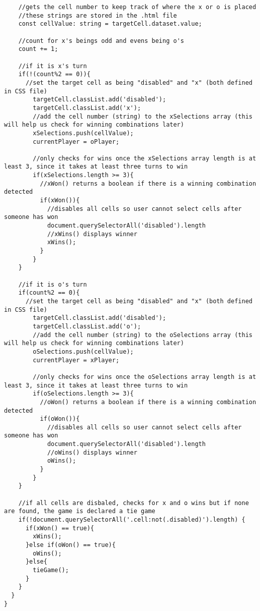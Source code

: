 \documentclass{article}
\theoremstyle{theorem}
\theoremstyle{definition}
\theoremstyle{remark}
\begin{document}
\begin{lstlisting}
    //gets the cell number to keep track of where the x or o is placed
    //these strings are stored in the .html file
    const cellValue: string = targetCell.dataset.value;

    //count for x's beings odd and evens being o's
    count += 1;

    //if it is x's turn
    if(!(count%2 == 0)){
      //set the target cell as being "disabled" and "x" (both defined in CSS file)
        targetCell.classList.add('disabled');
        targetCell.classList.add('x');
        //add the cell number (string) to the xSelections array (this will help us check for winning combinations later)
        xSelections.push(cellValue);
        currentPlayer = oPlayer;

        //only checks for wins once the xSelections array length is at least 3, since it takes at least three turns to win
        if(xSelections.length >= 3){
          //xWon() returns a boolean if there is a winning combination detected
          if(xWon()){
            //disables all cells so user cannot select cells after someone has won
            document.querySelectorAll('disabled').length
            //xWins() displays winner
            xWins();
          }
        }
    }

    //if it is o's turn
    if(count%2 == 0){
      //set the target cell as being "disabled" and "x" (both defined in CSS file)
        targetCell.classList.add('disabled');
        targetCell.classList.add('o');
        //add the cell number (string) to the oSelections array (this will help us check for winning combinations later)
        oSelections.push(cellValue);
        currentPlayer = xPlayer;

        //only checks for wins once the oSelections array length is at least 3, since it takes at least three turns to win
        if(oSelections.length >= 3){
          //oWon() returns a boolean if there is a winning combination detected
          if(oWon()){
            //disables all cells so user cannot select cells after someone has won
            document.querySelectorAll('disabled').length
            //oWins() displays winner
            oWins();
          }
        }
    }

    //if all cells are disbaled, checks for x and o wins but if none are found, the game is declared a tie game
    if(!document.querySelectorAll('.cell:not(.disabled)').length) {
      if(xWon() == true){
        xWins();
      }else if(oWon() == true){
        oWins();
      }else{
        tieGame();
      }
    }
  }
}


\end{lstlisting}
\end{document}
